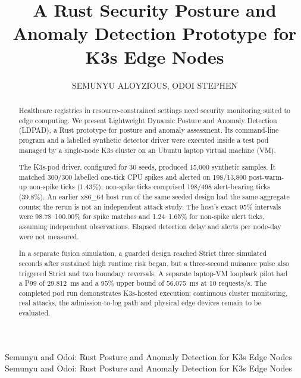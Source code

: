 \documentclass{ieeeaccess}
\begin{document}
\title{A Rust Security Posture and Anomaly Detection Prototype for K3s Edge Nodes}

\author{
\uppercase{Semunyu Aloyzious},
\uppercase{Odoi Stephen}
}

\address[1]{Department of Computer Science, Makerere University, Kampala, Uganda (e-mail: semunyu.aloyzious@students.mak.ac.ug; odoi.stephen@students.mak.ac.ug)}


\markboth
{Semunyu and Odoi: Rust Posture and Anomaly Detection for K3s Edge Nodes}
{Semunyu and Odoi: Rust Posture and Anomaly Detection for K3s Edge Nodes}


\begin{abstract}
Healthcare registries in resource-constrained settings need security monitoring suited to edge computing. We present Lightweight Dynamic Posture and Anomaly Detection (LDPAD), a Rust prototype for posture and anomaly assessment. Its command-line program and a labelled synthetic detector driver were executed inside a test pod managed by a single-node K3s cluster on an Ubuntu laptop virtual machine (VM).

\par\smallskip
The K3s-pod driver, configured for 30 seeds, produced 15,000 synthetic samples. It matched 300/300 labelled one-tick CPU spikes and alerted on 198/13,800 post-warm-up non-spike ticks (1.43\%); non-spike ticks comprised 198/498 alert-bearing ticks (39.8\%). An earlier x86\_64 host run of the same seeded design had the same aggregate counts; the rerun is not an independent attack study. The host's exact 95\% intervals were 98.78--100.00\% for spike matches and 1.24--1.65\% for non-spike alert ticks, assuming independent observations. Elapsed detection delay and alerts per node-day were not measured.

\par\smallskip
In a separate fusion simulation, a guarded design reached Strict three simulated seconds after sustained high runtime risk began, but a three-second nuisance pulse also triggered Strict and two boundary reversals. A separate laptop-VM loopback pilot had a P99 of 29.812~ms and a 95\% upper bound of 56.075~ms at 10 requests/s. The completed pod run demonstrates K3s-hosted execution; continuous cluster monitoring, real attacks, the admission-to-log path and physical edge devices remain to be evaluated.
\end{abstract}
\end{document}
